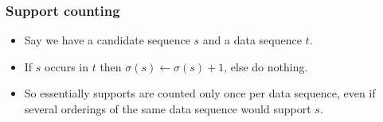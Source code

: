 \documentclass{beamer}
\begin{document}
\begin{frame}
  \frametitle{Support counting}
  \begin{itemize}
    \item{Say we have a candidate sequence $s$ and a data sequence $t$.}
    \item{If $s$ occurs in $t$ then $\sigma(s) \leftarrow \sigma(s) + 1$, else
    do nothing.}
    \item{So essentially supports are counted only once per data sequence, even
    if several orderings of the same data sequence would support $s$.}
  \end{itemize}
\end{frame}
\end{document}
